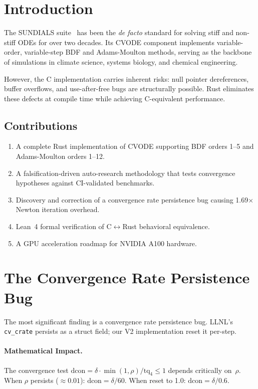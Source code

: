 \documentclass[manuscript,screen,review]{acmart}
\begin{document}
\section{Introduction}
The SUNDIALS suite~\cite{hindmarsh2005sundials} has been the \emph{de facto} standard for solving stiff and non-stiff ODEs for over two decades. Its CVODE component implements variable-order, variable-step BDF and Adams-Moulton methods, serving as the backbone of simulations in climate science, systems biology, and chemical engineering.

However, the C implementation carries inherent risks: null pointer dereferences, buffer overflows, and use-after-free bugs are structurally possible. Rust eliminates these defects at compile time while achieving C-equivalent performance.

\subsection{Contributions}
\begin{enumerate}
\item A complete Rust implementation of CVODE supporting BDF orders 1--5 and Adams-Moulton orders 1--12.
\item A falsification-driven auto-research methodology that tests convergence hypotheses against CI-validated benchmarks.
\item Discovery and correction of a convergence rate persistence bug causing 1.69$\times$ Newton iteration overhead.
\item Lean~4 formal verification of C$\leftrightarrow$Rust behavioral equivalence.
\item A GPU acceleration roadmap for NVIDIA A100 hardware.
\end{enumerate}

\section{The Convergence Rate Persistence Bug}

The most significant finding is a convergence rate persistence bug. LLNL's \texttt{cv\_crate} persists as a struct field; our V2 implementation reset it per-step.

\paragraph{Mathematical Impact.} The convergence test $\text{dcon} = \delta \cdot \min(1, \rho) / \text{tq}_4 \leq 1$ depends critically on~$\rho$. When $\rho$ persists ($\approx 0.01$): $\text{dcon} = \delta / 60$. When reset to 1.0: $\text{dcon} = \delta / 0.6$.
\end{document}
